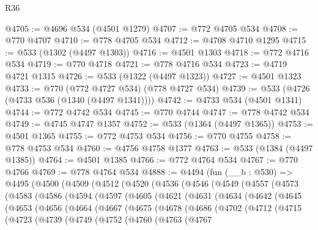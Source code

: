 \begin{lexlean}{R36}
\begin{coremodule}
@4705 := @4696 @534 (@4501 @1279)
@4707 := @772 @4705 @534
@4708 := @770 @4707
@4710 := @778 @4705 @534
@4712 := @4708 @4710 @1295
@4715 := @533 (@1302 (@4497 @1303))
@4716 := @4501 @1303
@4718 := @772 @4716 @534
@4719 := @770 @4718
@4721 := @778 @4716 @534
@4723 := @4719 @4721 @1315
@4726 := @533 (@1322 (@4497 @1323))
@4727 := @4501 @1323
@4733 := @770 (@772 @4727 @534) (@778 @4727 @534)
@4739 := @533 (@4726 (@4733 @536 (@1340 (@4497 @1341))))
@4742 := @4733 @534 (@4501 @1341)
@4744 := @772 @4742 @534
@4745 := @770 @4744
@4747 := @778 @4742 @534
@4749 := @4745 @4747 @1357
@4752 := @533 (@1364 (@4497 @1365))
@4753 := @4501 @1365
@4755 := @772 @4753 @534
@4756 := @770 @4755
@4758 := @778 @4753 @534
@4760 := @4756 @4758 @1377
@4763 := @533 (@1384 (@4497 @1385))
@4764 := @4501 @1385
@4766 := @772 @4764 @534
@4767 := @770 @4766
@4769 := @778 @4764 @534
@4888 := @4494
    (fun (__b : @530) =>
    @4495
      (@4500
        (@4509
          (@4512
            (@4520
              (@4536
                (@4546
                  (@4549
                    (@4557
                      (@4573
                        (@4583
                          (@4586
                            (@4594
                              (@4597
                                (@4605
                                  (@4621
                                    (@4631
                                      (@4634
                                        (@4642
                                          (@4645
                                            (@4653
                                              (@4656
                                                (@4664
                                                  (@4667
                                                    (@4675
                                                      (@4678
                                                        (@4686
                                                          (@4702
                                                            (@4712
                                                              (@4715
                                                                (@4723
                                                                  (@4739
                                                                    (@4749
                                                                      (@4752
                                                                        (@4760
                                                                          (@4763
                                                                            (@4767

\end{coremodule}
\end{lexlean}

